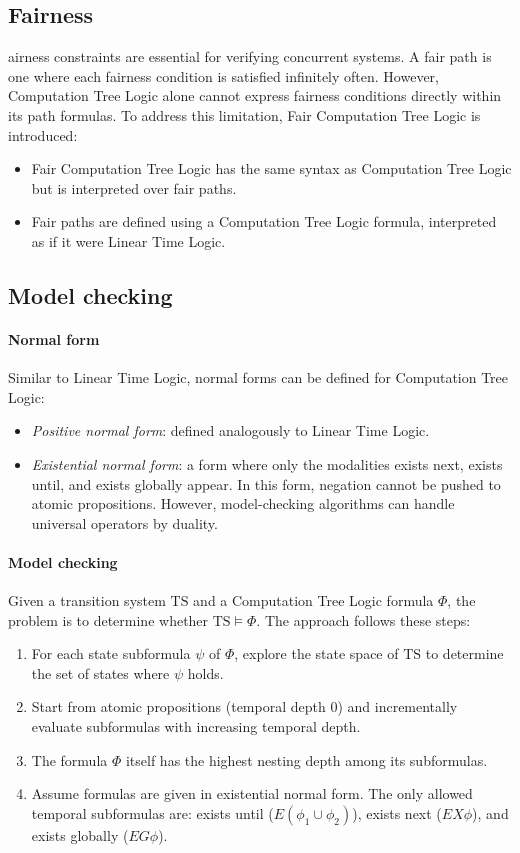 \subsection{Fairness}
airness constraints are essential for verifying concurrent systems. 
A fair path is one where each fairness condition is satisfied infinitely often. 
However, Computation Tree Logic alone cannot express fairness conditions directly within its path formulas.
To address this limitation, Fair Computation Tree Logic is introduced:
\begin{itemize}
    \item Fair Computation Tree Logic has the same syntax as Computation Tree Logic but is interpreted over fair paths.
    \item Fair paths are defined using a Computation Tree Logic formula, interpreted as if it were Linear Time Logic.
\end{itemize}

\subsection{Model checking}
\paragraph*{Normal form}
Similar to Linear Time Logic, normal forms can be defined for Computation Tree Logic:
\begin{itemize}
    \item \textit{Positive normal form}: defined analogously to Linear Time Logic.
    \item \textit{Existential normal form}: a form where only the modalities exists next, exists until, and exists globally appear.
        In this form, negation cannot be pushed to atomic propositions.
        However, model-checking algorithms can handle universal operators by duality. 
\end{itemize}

\paragraph*{Model checking}
Given a transition system $\text{TS}$ and a Computation Tree Logic formula $\Phi$, the problem is to determine whether $\text{TS} \models \Phi$. 
The approach follows these steps:
\begin{enumerate}
    \item For each state subformula $\psi$ of $\Phi$, explore the state space of $\text{TS}$ to determine the set of states where $\psi$ holds.
    \item Start from atomic propositions (temporal depth 0) and incrementally evaluate subformulas with increasing temporal depth.
    \item The formula $\Phi$ itself has the highest nesting depth among its subformulas.
    \item Assume formulas are given in existential normal form. 
        The only allowed temporal subformulas are: exists until ($E(\phi_1\cup\phi_2)$), exists next ($EX\phi$), and exists globally ($EG\phi$).
\end{enumerate}

